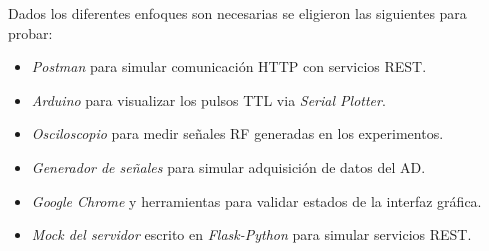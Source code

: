 Dados los diferentes enfoques son necesarias se eligieron las siguientes para probar:
\begin{itemize}
    \item \textit{Postman} para simular comunicaci\'on HTTP con servicios REST.
    \item \textit{Arduino} para visualizar los pulsos TTL via \textit{Serial Plotter}.
    \item \textit{Osciloscopio} para medir se\~nales RF generadas en los experimentos.
    \item \textit{Generador de se\~nales} para simular adquisici\'on de datos del AD.
    \item \textit{Google Chrome} y herramientas para validar estados de la interfaz gr\'afica.
    \item \textit{Mock del servidor} escrito en \textit{Flask-Python} para simular servicios REST.
\end{itemize}
\newpage